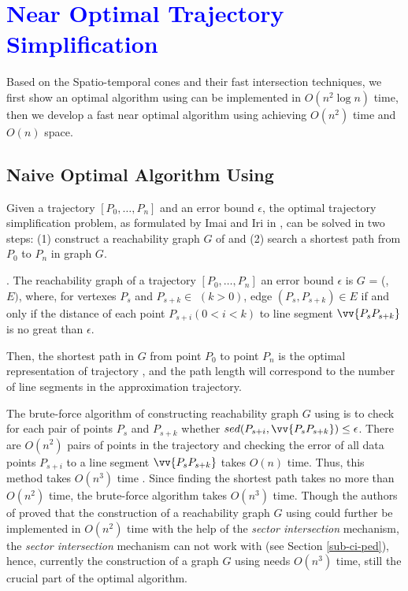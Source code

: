 \section{\textcolor{blue}{Near Optimal Trajectory Simplification}}
\label{sec-optimal}

Based on the Spatio-temporal cones and their fast intersection techniques, we first show an optimal algorithm using \sed can be implemented in $O(n^2\log n)$ time, then we develop a fast near optimal algorithm using \sed achieving $O(n^2)$ time and $O(n)$ space.

\subsection{Naive Optimal Algorithm Using \sed}

Given a trajectory ${[P_0, \ldots, P_n]}$ and an error bound $\epsilon$, the optimal trajectory simplification problem, as formulated by Imai and Iri in \cite{Imai:Optimal}, can be solved in two steps: (1) construct a reachability graph $G$ of  and (2) search a shortest path from $P_0$ to $P_{n}$ in graph $G$.

. The reachability graph of a trajectory ${[P_0, \ldots, P_n]}$ \wrt an error bound $\epsilon$ is $G$
= (, $E)$, where, for vertexes $P_s$ and $P_{s+k} \in$  $(k>0)$, edge $(P_s, P_{s+k}) \in E$ if and only if the distance of each point $P_{s+i} (0<i<k)$ to line segment $\vv{P_sP_{s+k}}$ is no great than $\epsilon$.

Then, the shortest path in $G$ from point $P_0$ to point $P_{n}$ is the optimal representation of trajectory , and the path length will correspond to the number of line segments in the approximation trajectory\cite{Imai:Optimal}. 


The brute-force algorithm of constructing reachability graph $G$ using \sed is to check for each pair of points $P_s$ and $P_{s+k}$ whether $sed(P_{s+i}, \vv{P_sP_{s+k}}) \le \epsilon$. 
There are $O(n^2)$ pairs of points in the trajectory and checking the error of all data points $P_{s+i}$ to a line segment $\vv{P_sP_{s+k}}$ takes $O(n)$ time. 
Thus, this method takes $O(n^3)$ time \cite{Imai:Optimal}. 
Since finding the shortest path takes no more than $O(n^2)$ time, the brute-force algorithm takes $O(n^3)$ time.
%
Though the authors of \cite{Chan:Optimal} proved that the construction of a reachability graph $G$ using \ped could further be implemented in $O(n^2)$ time with the help of the \textit{sector intersection} mechanism, the \textit{sector intersection} mechanism can not work with \sed (see Section \ref{sub-ci-ped}), hence, currently the construction of a graph $G$ using \sed needs $O(n^3)$ time, still the crucial part of the optimal algorithm.
 
